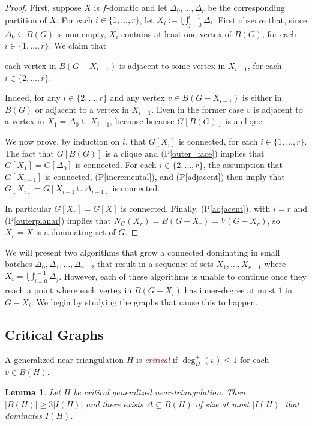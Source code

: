 \documentclass[12pt]{article}
\newcommand{\pref}[1]{(P\ref{#1})}
\newtheorem{lem}{Lemma}
\newcommand{\defin}[1]{\emph{\textcolor{Maroon}{#1}}}
\begin{document}
\begin{proof}
  First, suppose $X$ is $f$-domatic and let $\Delta_0,\ldots,\Delta_r$ be the corresponding partition of $X$.  For each $i\in\{1,\ldots,r\}$, let $X_i:=\bigcup_{j=0}^{i-1} \Delta_i$.  First observe that, since $\Delta_0\subseteq B(G)$ is non-empty, $X_i$ contains at least one vertex of $B(G)$, for each $i\in\{1,\ldots,r\}$. We claim that
  \begin{compactenum}[(P1)]\setcounter{enumi}{3}
    \item each vertex in $B(G-X_{i-1})$ is adjacent to some vertex in $X_{i-1}$, for each $i\in\{2,\ldots,r\}$. \label{adjacent} 
  \end{compactenum} 
  Indeed, for any $i\in\{2,\ldots,r\}$ and any vertex $v\in B(G-X_{i-1})$ is either in $B(G)$ or adjacent to a vertex in $X_{i-1}$. Even in the former case $v$ is adjacent to a vertex in $X_1=\Delta_0\subseteq X_{i-1}$, because because $G[B(G)]$ is a clique.

  We now prove, by induction on $i$, that $G[X_i]$ is connected, for each $i\in\{1,\ldots,r\}$.
  The fact that $G[B(G)]$ is a clique and \pref{outer_face} implies that $G[X_1]=G[\Delta_0]$ is connected. For each $i\in\{2,\ldots,r\}$, the assumption that $G[X_{i-1}]$ is connected, \pref{incremental}, and \pref{adjacent} then imply that $G[X_i]=G[X_{i-1}\cup\Delta_{i-1}]$ is connected.  
  
  In particular $G[X_r]=G[X]$ is connected.  Finally, \pref{adjacent}, with $i=r$ and \pref{outerplanar} implies that $N_G(X_r)=B(G-X_r)=V(G-X_r)$, so $X_r=X$ is a dominating set of $G$.
\end{proof}

We will present two algorithms that grow a connected dominating in small batches $\Delta_0,\Delta_1,\ldots,\Delta_{r-2}$ that result in a sequence of sets $X_1,\ldots,X_{r-1}$ where $X_{i}=\bigcup_{j=0}^{i-1}\Delta_j$.  However, each of these algorithms is unable to continue once they reach a point where each vertex in $B(G-X_i)$ has inner-degree at most $1$ in $G-X_i$.  We begin by studying the graphs that cause this to happen.

\subsection{Critical Graphs}

A generalized near-triangulation $H$ is \defin{critical} if $\deg^+_H(v)\le 1$ for each $v\in B(H)$.


\begin{lem}\label{base_case}
    Let $H$ be critical generalized near-triangulation. Then $|B(H)|\ge 3|I(H)|$ and there exists $\Delta\subseteq B(H)$ of size at most $|I(H)|$ that dominates $I(H)$. 
\end{lem}
\end{document}

